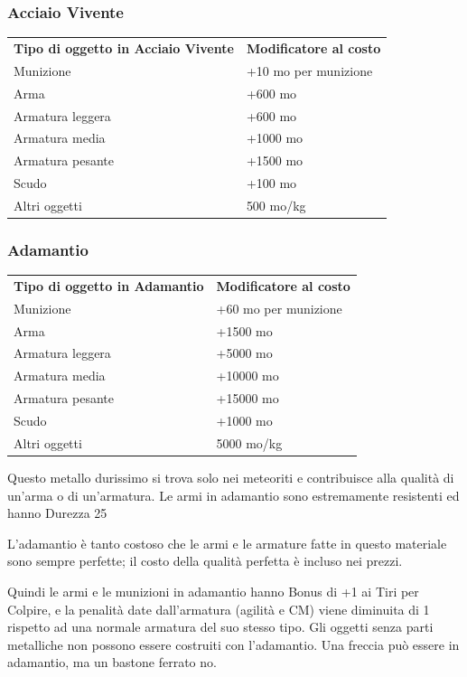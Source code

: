\documentclass[a4paper,11pt,twoside,openany]{book}
\begin{document}
\subsubsection{Acciaio Vivente}

\label{acciaio-vivente}

\begin{tabular}{ll}
	\toprule
	\textbf{Tipo di oggetto in Acciaio Vivente} & \textbf{Modificatore al costo}\tabularnewline
	Munizione                         & +10 mo per munizione\tabularnewline
	Arma                              & +600 mo\tabularnewline
	Armatura leggera                  & +600 mo\tabularnewline
	Armatura media                    & +1000 mo\tabularnewline
	Armatura pesante                  & +1500 mo\tabularnewline
	Scudo                             & +100 mo\tabularnewline
	Altri oggetti                     & 500 mo/kg\tabularnewline
\end{tabular}

\subsubsection{Adamantio}

\label{adamantio}

\begin{tabular}{ll}
	\toprule
	\textbf{Tipo di oggetto in Adamantio} & \textbf{Modificatore al costo}\tabularnewline
	Munizione                   & +60 mo per munizione\tabularnewline
	Arma                        & +1500 mo\tabularnewline
	Armatura leggera            & +5000 mo\tabularnewline
	Armatura media              & +10000 mo\tabularnewline
	Armatura pesante            & +15000 mo\tabularnewline
	Scudo                       & +1000 mo\tabularnewline
	Altri oggetti               & 5000 mo/kg\tabularnewline
\end{tabular}

Questo metallo durissimo si trova solo nei meteoriti e contribuisce alla qualità di un'arma o di un'armatura. Le armi in adamantio sono estremamente resistenti ed hanno Durezza 25

L'adamantio è tanto costoso che le armi e le armature fatte in questo materiale sono sempre perfette; il costo della qualità perfetta è incluso nei prezzi.

Quindi le armi e le munizioni in adamantio hanno Bonus di +1 ai Tiri per Colpire, e la penalità date dall'armatura (agilità e CM) viene diminuita di 1 rispetto ad una normale armatura del suo stesso tipo. Gli oggetti senza parti metalliche non possono essere costruiti con l'adamantio. Una freccia può essere in adamantio, ma un bastone ferrato
no.
\end{document}
